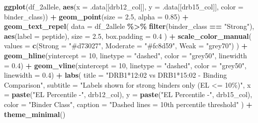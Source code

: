 \documentclass[
]{article}
\newenvironment{Shaded}{\begin{snugshade}}{\end{snugshade}}
\newcommand{\AttributeTok}[1]{\textcolor[rgb]{0.13,0.29,0.53}{#1}}
\newcommand{\DecValTok}[1]{\textcolor[rgb]{0.00,0.00,0.81}{#1}}
\newcommand{\FloatTok}[1]{\textcolor[rgb]{0.00,0.00,0.81}{#1}}
\newcommand{\FunctionTok}[1]{\textcolor[rgb]{0.13,0.29,0.53}{\textbf{#1}}}
\newcommand{\NormalTok}[1]{#1}
\newcommand{\SpecialCharTok}[1]{\textcolor[rgb]{0.81,0.36,0.00}{\textbf{#1}}}
\newcommand{\StringTok}[1]{\textcolor[rgb]{0.31,0.60,0.02}{#1}}
\begin{document}
\begin{Shaded}
\begin{Highlighting}[]
\FunctionTok{ggplot}\NormalTok{(df\_2allele,}
       \FunctionTok{aes}\NormalTok{(}\AttributeTok{x     =}\NormalTok{ .data[[drb12\_col]],}
           \AttributeTok{y     =}\NormalTok{ .data[[drb15\_col]],}
           \AttributeTok{color =}\NormalTok{ binder\_class)) }\SpecialCharTok{+}
  \FunctionTok{geom\_point}\NormalTok{(}\AttributeTok{size =} \FloatTok{2.5}\NormalTok{, }\AttributeTok{alpha =} \FloatTok{0.85}\NormalTok{) }\SpecialCharTok{+}
  \FunctionTok{geom\_text\_repel}\NormalTok{(}
    \AttributeTok{data =}\NormalTok{ df\_2allele }\SpecialCharTok{\%\textgreater{}\%} \FunctionTok{filter}\NormalTok{(binder\_class }\SpecialCharTok{==} \StringTok{"Strong"}\NormalTok{),}
    \FunctionTok{aes}\NormalTok{(}\AttributeTok{label =}\NormalTok{ peptide), }\AttributeTok{size =} \FloatTok{2.5}\NormalTok{, }\AttributeTok{box.padding =} \FloatTok{0.4}
\NormalTok{  ) }\SpecialCharTok{+}
  \FunctionTok{scale\_color\_manual}\NormalTok{(}
    \AttributeTok{values =} \FunctionTok{c}\NormalTok{(}\AttributeTok{Strong =} \StringTok{"\#d73027"}\NormalTok{, }\AttributeTok{Moderate =} \StringTok{"\#fc8d59"}\NormalTok{, }\AttributeTok{Weak =} \StringTok{"grey70"}\NormalTok{)}
\NormalTok{  ) }\SpecialCharTok{+}
  \FunctionTok{geom\_hline}\NormalTok{(}\AttributeTok{yintercept =} \DecValTok{10}\NormalTok{, }\AttributeTok{linetype =} \StringTok{"dashed"}\NormalTok{, }\AttributeTok{color =} \StringTok{"grey50"}\NormalTok{, }\AttributeTok{linewidth =} \FloatTok{0.4}\NormalTok{) }\SpecialCharTok{+}
  \FunctionTok{geom\_vline}\NormalTok{(}\AttributeTok{xintercept =} \DecValTok{10}\NormalTok{, }\AttributeTok{linetype =} \StringTok{"dashed"}\NormalTok{, }\AttributeTok{color =} \StringTok{"grey50"}\NormalTok{, }\AttributeTok{linewidth =} \FloatTok{0.4}\NormalTok{) }\SpecialCharTok{+}
  \FunctionTok{labs}\NormalTok{(}
    \AttributeTok{title    =} \StringTok{"DRB1*12:02 vs DRB1*15:02 {-} Binding Comparison"}\NormalTok{,}
    \AttributeTok{subtitle =} \StringTok{"Labels shown for strong binders only (EL \textless{}= 10\%)"}\NormalTok{,}
    \AttributeTok{x        =} \FunctionTok{paste}\NormalTok{(}\StringTok{"EL Percentile {-}"}\NormalTok{, drb12\_col),}
    \AttributeTok{y        =} \FunctionTok{paste}\NormalTok{(}\StringTok{"EL Percentile {-}"}\NormalTok{, drb15\_col),}
    \AttributeTok{color    =} \StringTok{"Binder Class"}\NormalTok{,}
    \AttributeTok{caption  =} \StringTok{"Dashed lines = 10th percentile threshold"}
\NormalTok{  ) }\SpecialCharTok{+}
  \FunctionTok{theme\_minimal}\NormalTok{()}
\end{Highlighting}
\end{Shaded}
\end{document}
